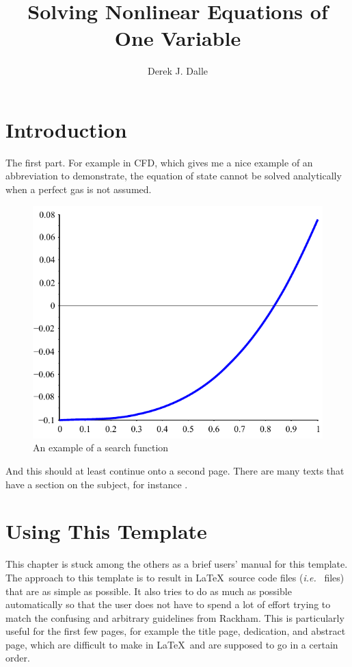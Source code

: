 \documentclass[thesis]{./tex/thesis-umich}
\title{Solving Nonlinear Equations of One Variable}
\author{Derek J. Dalle}
\begin{document}
\chapter{Introduction}   \label{chap:intro}
The first part.  For example in \ac{CFD}, which gives me a nice
example of an abbreviation to demonstrate, the equation of state
cannot be solved analytically when a perfect gas is not assumed.

\begin{figure}
 \begin{center}
  \includegraphics[scale=1]{./pics/f1_plain.pdf}
 \end{center}
 \caption{ \label{fig:fn:1}
  An example of a search function}
\end{figure}

\newpage

And this should at least continue onto a second page.  There are many
texts that have a section on the subject, for instance
\cite{chapra:2002:numerics}.

\chapter{Using This Template}   \label{chap:manual}
This chapter is stuck among the others as a brief users' manual for this
template.  The approach to this template is to result in \LaTeX~source
code files (\textit{i.e.}~ files) that are as simple as
possible.  It also tries to do as much as possible automatically so that
the user does not have to spend a lot of effort trying to match the
confusing and arbitrary guidelines from Rackham.  This is particularly
useful for the first few pages, for example the title page, dedication,
and abstract page, which are difficult to make in \LaTeX~and are
supposed to go in a certain order.
\end{document}
